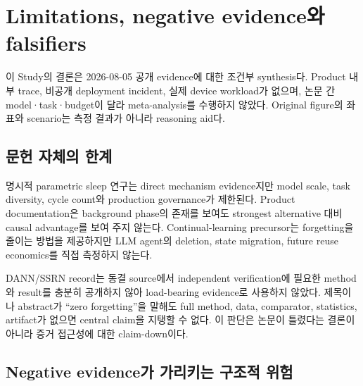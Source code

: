 \chapter{Limitations, negative evidence와 falsifiers}
\label{STC-S16}

이 Study의 결론은 2026-08-05 공개 evidence에 대한 조건부 synthesis다. Product 내부 trace, 비공개
deployment incident, 실제 device workload가 없으며, 논문 간 model·task·budget이 달라 meta-analysis를
수행하지 않았다. Original figure의 좌표와 scenario는 측정 결과가 아니라 reasoning aid다.

\section{문헌 자체의 한계}

명시적 parametric sleep 연구는 direct mechanism evidence지만 model scale, task diversity, cycle count와
production governance가 제한된다. Product documentation은 background phase의 존재를 보여도 strongest
alternative 대비 causal advantage를 보여 주지 않는다. Continual-learning precursor는 forgetting을 줄이는
방법을 제공하지만 LLM agent의 deletion, state migration, future reuse economics를 직접 측정하지 않는다.

DANN/SSRN record는 동결 source에서 independent verification에 필요한 method와 result를 충분히 공개하지
않아 load-bearing evidence로 사용하지 않았다.\autocite{srcstc0039} 제목이나 abstract가
``zero forgetting''을 말해도 full method, data, comparator, statistics, artifact가 없으면 central claim을
지탱할 수 없다. 이 판단은 논문이 틀렸다는 결론이 아니라 증거 접근성에 대한 claim-down이다.

\section{Negative evidence가 가리키는 구조적 위험}

